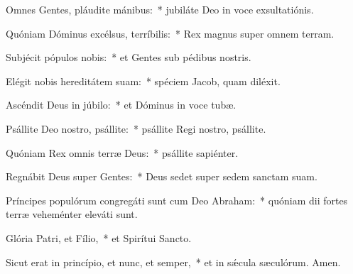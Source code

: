 \item Omnes Gentes, pláudite mánibus:~* jubiláte Deo in voce exsultatiónis.

\item Quóniam Dóminus excélsus, terríbilis:~* Rex magnus super omnem terram.

\item Subjécit pópulos nobis:~* et Gentes sub pédibus nostris.

\item Elégit nobis hereditátem suam:~* spéciem Jacob, quam diléxit.

\item Ascéndit Deus in júbilo:~* et Dóminus in voce tubæ.

\item Psállite Deo nostro, psállite:~* psállite Regi nostro, psállite.

\item Quóniam Rex omnis terræ Deus:~* psállite sapiénter.

\item Regnábit Deus super Gentes:~* Deus sedet super sedem sanctam suam.

\item Príncipes populórum congregáti sunt cum Deo Abraham:~* quóniam dii fortes terræ veheménter eleváti sunt.

\item Glória Patri, et Fílio,~* et Spirítui Sancto.

\item Sicut erat in princípio, et nunc, et semper,~* et in sǽcula sæculórum. Amen.

